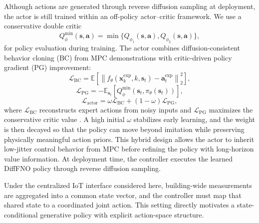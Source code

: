 ﻿\documentclass[conference]{IEEEtran}
\theoremstyle{nonumberplain}
\theoremstyle{plain}
\begin{document}
Although actions are generated through reverse diffusion sampling at deployment, the actor is still trained within an off-policy actor--critic framework. We use a conservative double critic
\begin{equation}
    Q_{\phi}^{\min}(\mathbf{s},\mathbf{a})=
    \min\{Q_{\phi_1}(\mathbf{s},\mathbf{a}),Q_{\phi_2}(\mathbf{s},\mathbf{a})\},
    \label{eq:qmin}
\end{equation}
for policy evaluation during training. The actor combines diffusion-consistent behavior cloning (BC) from MPC demonstrations with critic-driven policy gradient (PG) improvement:
\begin{equation}
    \mathcal{L}_{\mathrm{BC}}=
    \mathbb{E}\left[
    \left\|
    f_{\theta}(\mathbf{x}_k^{\mathrm{exp}},k,\mathbf{s}_t)-
    \mathbf{a}_t^{\mathrm{exp}}
    \right\|_2^2
    \right],
    \label{eq:bc_loss}
\end{equation}
\begin{equation}
    \mathcal{L}_{\mathrm{PG}}=
    -\mathbb{E}_{\mathbf{s}_t}\left[
    Q_{\phi}^{\min}(\mathbf{s}_t,\pi_{\theta}(\mathbf{s}_t))
    \right],
    \label{eq:pg_loss}
\end{equation}
\begin{equation}
    \mathcal{L}_{\mathrm{actor}}=
    \omega \mathcal{L}_{\mathrm{BC}}+
    (1-\omega)\mathcal{L}_{\mathrm{PG}},
    \label{eq:actor_loss}
\end{equation}
where $\mathcal{L}_{\mathrm{BC}}$ reconstructs expert actions from noisy inputs and $\mathcal{L}_{\mathrm{PG}}$ maximizes the conservative critic value \cite{fujimoto2021minimalist}. A high initial $\omega$ stabilizes early learning, and the weight is then decayed so that the policy can move beyond imitation while preserving physically meaningful action priors. This hybrid design allows the actor to inherit low-jitter control behavior from MPC before refining the policy with long-horizon value information. At deployment time, the controller executes the learned DiffFNO policy through reverse diffusion sampling.

Under the centralized IoT interface considered here, building-wide measurements are aggregated into a common state vector, and the controller must map that shared state to a coordinated joint action. This setting directly motivates a state-conditional generative policy with explicit action-space structure.
\end{document}

